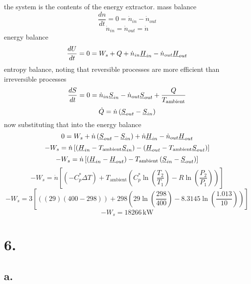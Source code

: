 \documentclass{article}
\begin{document}
the system is the contents of the energy extractor. mass balance
\[ \frac{dn}{dt} = 0 = \dot{n}_{in} - \dot{n}_{out} \]
\[ \dot{n}_{in} = \dot{n}_{out} = \dot{n} \]
energy balance
\[ \frac{dU}{dt} = 0 = W_s + Q + \dot{n}_{in}\underbar{$H$}_{in} - \dot{n}_{out}\underbar{$H$}_{out} \]
entropy balance, noting that reversible processes are more efficient than irreversible processes
\[ \frac{dS}{dt} = 0 = \dot{n}_{in}\underbar{$S$}_{in} - \dot{n}_{out}\underbar{$S$}_{out} + \frac{Q}{T_{\text{ambient}}} \]
\[ \dot{Q} = \dot{n}\left(\underbar{$S$}_{out} - \underbar{$S$}_{in}\right) \]
now substituting that into the energy balance
\[ 0 = W_s + \dot{n}\left(\underbar{$S$}_{out} - \underbar{$S$}_{in}\right) +\dot{n}\underbar{$H$}_{in} - \dot{n}_{out}\underbar{$H$}_{out} \]
\[ -W_s = \dot{n} \left[ \left(\underbar{$H$}_{in} - T_{\text{ambient}}\underbar{$S$}_{in}\right) - \left(\underbar{$H$}_{out} - T_{\text{ambient}}\underbar{$S$}_{out}\right) \right] \]
\[ -W_s = \dot{n} \left[ \left(\underbar{$H$}_{in} - \underbar{$H$}_{out}\right) - T_{\text{ambient}}\left(\underbar{$S$}_{in} - \underbar{$S$}_{out}\right) \right] \]
\[ -W_s = \dot{n} \left[ \left(- C_p^* \Delta T \right) + T_{\text{ambient}}\left(C_p^* \ln \left(\frac{T_2}{T_1}\right) - R \ln \left(\frac{P_2}{P_1}\right)\right) \right] \]
\[ -W_s = 3 \left[ \left( (29) (400-298) \right) + 298\left(29 \ln \left(\frac{298}{400}\right) - 8.3145 \ln \left(\frac{1.013}{10}\right)\right) \right] \]
\[ -W_s = 18266\,\text{kW} \]




\section*{6.}

\subsection*{a.}
\end{document}
